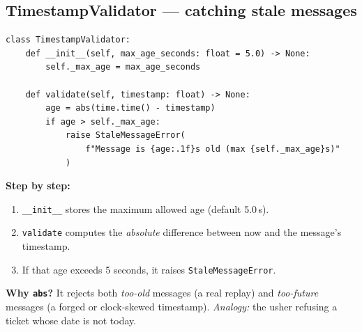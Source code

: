 \documentclass[11pt,a4paper]{report}
\begin{document}
\subsection{TimestampValidator --- catching stale messages}
\begin{lstlisting}[style=py,caption={auth\_protocol.py --- the timestamp validator.}]
class TimestampValidator:
    def __init__(self, max_age_seconds: float = 5.0) -> None:
        self._max_age = max_age_seconds

    def validate(self, timestamp: float) -> None:
        age = abs(time.time() - timestamp)
        if age > self._max_age:
            raise StaleMessageError(
                f"Message is {age:.1f}s old (max {self._max_age}s)"
            )
\end{lstlisting}
\textbf{Step by step:}
\begin{enumerate}
  \item \texttt{\_\_init\_\_} stores the maximum allowed age (default 5.0\,s).
  \item \texttt{validate} computes the \emph{absolute} difference between now and
        the message's timestamp.
  \item If that age exceeds 5 seconds, it raises \texttt{StaleMessageError}.
\end{enumerate}
\textbf{Why \texttt{abs}?} It rejects both \emph{too-old} messages (a real replay)
and \emph{too-future} messages (a forged or clock-skewed timestamp).
\emph{Analogy:} the usher refusing a ticket whose date is not today.
\end{document}
